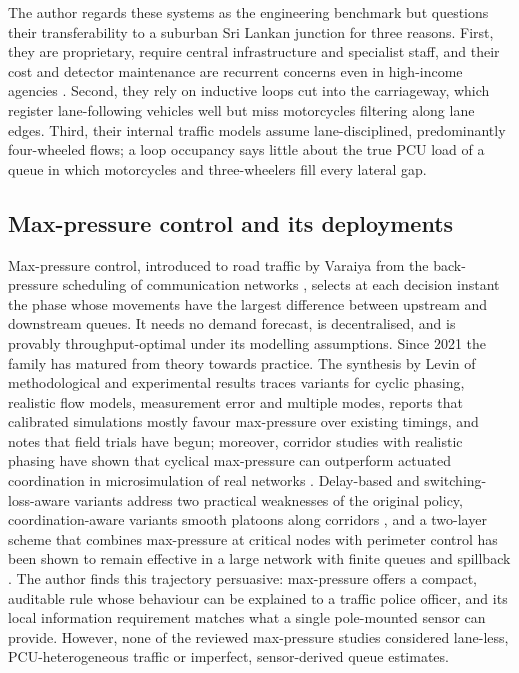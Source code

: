 The author regards these systems as the engineering benchmark but questions their transferability to a suburban
Sri Lankan junction for three reasons. First, they are proprietary, require central infrastructure and
specialist staff, and their cost and detector maintenance are recurrent concerns even in high-income agencies
\cite{stevanovic2010nchrp}. Second, they rely on inductive loops cut into the carriageway, which register
lane-following vehicles well but miss motorcycles filtering along lane edges. Third, their internal traffic
models assume lane-disciplined, predominantly four-wheeled flows; a loop occupancy says little about the true
PCU load of a queue in which motorcycles and three-wheelers fill every lateral gap.

\subsection{Max-pressure control and its deployments}
Max-pressure control, introduced to road traffic by Varaiya \cite{varaiya2013maxpressure} from the back-pressure
scheduling of communication networks \cite{tassiulas1992}, selects at each decision instant the phase whose
movements have the largest difference between upstream and downstream queues. It needs no demand forecast, is
decentralised, and is provably throughput-optimal under its modelling assumptions. Since 2021 the family has
matured from theory towards practice. The synthesis by Levin of methodological and experimental results
\cite{levin2023maxpressure} traces variants for cyclic phasing, realistic flow models, measurement error and
multiple modes, reports that calibrated simulations mostly favour max-pressure over existing timings, and notes
that field trials have begun; moreover,
corridor studies with realistic phasing have shown that cyclical max-pressure can outperform actuated
coordination in microsimulation of real networks \cite{barman2022performance}. Delay-based \cite{liu2022novel}
and switching-loss-aware \cite{wang2022learning} variants address two practical weaknesses of the original
policy, coordination-aware variants smooth platoons along corridors \cite{xu2024smoothingmp}, and a two-layer
scheme that combines max-pressure at critical nodes with perimeter control has been shown to remain effective in
a large network with finite queues and spillback \cite{tsitsokas2023twolayer}. The author finds this trajectory
persuasive: max-pressure offers a compact, auditable rule whose
behaviour can be explained to a traffic police officer, and its local information requirement matches what a
single pole-mounted sensor can provide. However, none of the reviewed max-pressure studies considered
lane-less, PCU-heterogeneous traffic or imperfect, sensor-derived queue estimates.

